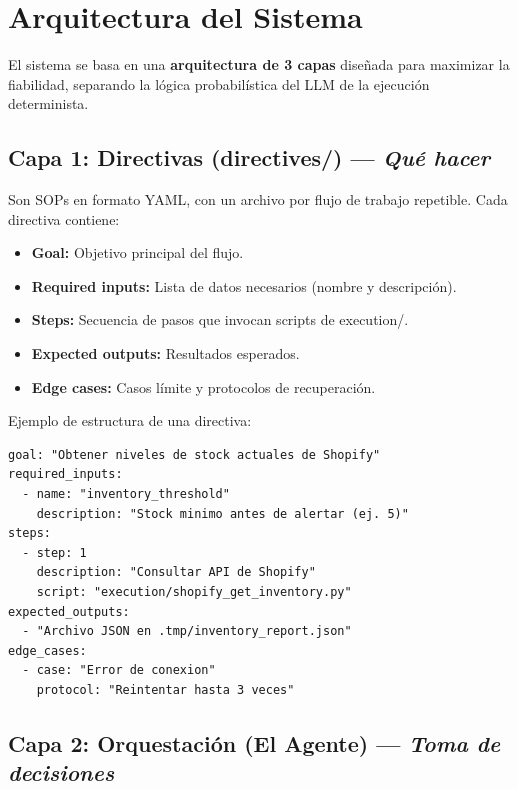 \documentclass[a4paper,12pt]{article}
\begin{document}
\section{Arquitectura del Sistema}

El sistema se basa en una \textbf{arquitectura de 3 capas} diseñada para maximizar la fiabilidad, separando la lógica probabilística del LLM de la ejecución determinista.

\subsection{Capa 1: Directivas (directives/) --- \textit{Qué hacer}}

Son SOPs en formato YAML, con un archivo por flujo de trabajo repetible. Cada directiva contiene:

\begin{itemize}
    \item \textbf{Goal:} Objetivo principal del flujo.
    \item \textbf{Required inputs:} Lista de datos necesarios (nombre y descripción).
    \item \textbf{Steps:} Secuencia de pasos que invocan scripts de execution/.
    \item \textbf{Expected outputs:} Resultados esperados.
    \item \textbf{Edge cases:} Casos límite y protocolos de recuperación.
\end{itemize}

Ejemplo de estructura de una directiva:

\begin{lstlisting}
goal: "Obtener niveles de stock actuales de Shopify"
required_inputs:
  - name: "inventory_threshold"
    description: "Stock minimo antes de alertar (ej. 5)"
steps:
  - step: 1
    description: "Consultar API de Shopify"
    script: "execution/shopify_get_inventory.py"
expected_outputs:
  - "Archivo JSON en .tmp/inventory_report.json"
edge_cases:
  - case: "Error de conexion"
    protocol: "Reintentar hasta 3 veces"
\end{lstlisting}

\subsection{Capa 2: Orquestación (El Agente) --- \textit{Toma de decisiones}}
\end{document}
